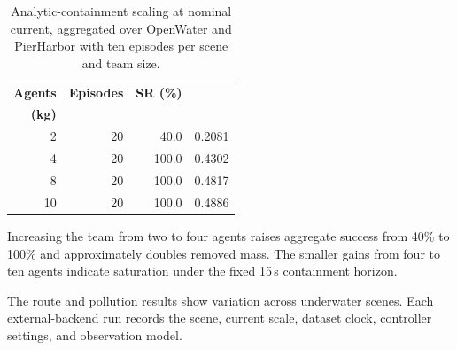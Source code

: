 \begin{table}[!ht]
\centering
\scriptsize
\setlength{\tabcolsep}{5pt}
\renewcommand{\arraystretch}{1.08}
\begin{tabular}{r r r r}
\toprule
\textbf{Agents} & \textbf{Episodes} & \textbf{SR (\%)} & \makecell{\textbf{Removed mass}\\\textbf{(kg)}} \\
\midrule
2 & 20 & 40.0 & 0.2081 \\
4 & 20 & 100.0 & 0.4302 \\
8 & 20 & 100.0 & 0.4817 \\
10 & 20 & 100.0 & 0.4886 \\
\bottomrule
\end{tabular}
\caption{Analytic-containment scaling at nominal current, aggregated over OpenWater and PierHarbor with ten episodes per scene and team size.}
\label{tab:app_external_scaling}
\end{table}

Increasing the team from two to four agents raises aggregate success from 40\% to 100\% and approximately doubles removed mass. The smaller gains from four to ten agents indicate saturation under the fixed 15\,s containment horizon.

The route and pollution results show variation across underwater scenes. Each external-backend run records the scene, current scale, dataset clock, controller settings, and observation model.
